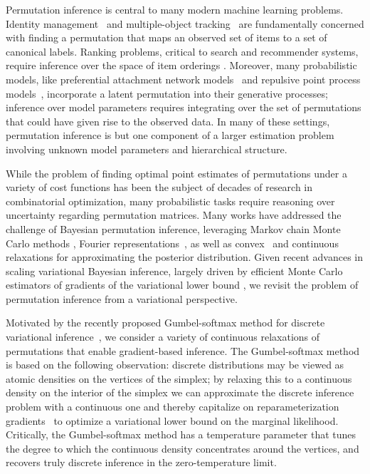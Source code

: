 \documentclass{article}
\begin{document}
Permutation inference is central to many modern machine learning
problems.  Identity management~\citep{guibas2008identity} and
multiple-object tracking~\citep{shin2005lazy, kondor2007multi} are
fundamentally concerned with finding a permutation that maps an
observed set of items to a set of canonical labels.
Ranking problems, critical to search and recommender systems, require
inference over the space of item orderings \citep{meilua2007consensus,
  lebanon2008non, adams2011ranking}.  Moreover, many probabilistic models, like
preferential attachment network models~\citep{bloem2016random} and
repulsive point process models~\citep{rao2016bayesian}, incorporate a
latent permutation into their generative processes; inference over
model parameters requires integrating over the set of permutations
that could have given rise to the observed data.  In many of these
settings, permutation inference is but one component of a larger
estimation problem involving unknown model parameters and hierarchical
structure.

While the problem of finding optimal point estimates of permutations
under a variety of cost functions has been the subject of decades of
research in combinatorial optimization, many probabilistic
tasks require reasoning over uncertainty regarding permutation
matrices.  Many works have addressed the challenge of Bayesian
permutation inference, leveraging Markov chain Monte Carlo methods
\citep{diaconis1988group}, Fourier
representations~\citep{kondor2007multi, huang2009fourier}, as well as
convex~\citep{lim2014beyond} and
continuous~\citep{plis2011directional} relaxations for approximating
the posterior distribution.  Given recent advances in scaling variational
Bayesian inference, largely driven by efficient Monte Carlo estimators
of gradients of the variational lower bound \citep{Kingma2014, rezende2014stochastic},
we revisit the problem of permutation inference from a variational perspective. 


Motivated by the recently proposed Gumbel-softmax method for discrete
variational inference~\citep{jang2016categorical,
  maddison2016concrete}, we consider a variety of continuous
relaxations of permutations that enable gradient-based inference.  The
Gumbel-softmax method is based on the following observation: discrete
distributions may be viewed as atomic densities on the vertices of the
simplex; by relaxing this to a continuous density on the interior of
the simplex we can approximate the discrete inference problem with a
continuous one and thereby capitalize on reparameterization
gradients~\citep{Kingma2014, rezende2014stochastic} to optimize a
variational lower bound on the marginal likelihood.  Critically, the
Gumbel-softmax method has a temperature parameter that tunes the
degree to which the continuous density concentrates around the
vertices, and recovers truly discrete inference in the
zero-temperature limit.
\end{document}
